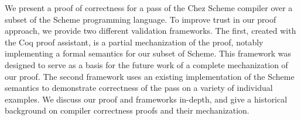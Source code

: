 We present a proof of correctness for a pass of the Chez Scheme compiler over a subset of the Scheme programming language. To improve trust in our proof approach, we provide two different validation frameworks. The first, created with the Coq proof assistant, is a partial mechanization of the proof, notably implementing a formal semantics for our subset of Scheme. This framework was designed to serve as a basis for the future work of a complete mechanization of our proof. The second framework uses an existing implementation of the Scheme semantics to demonstrate correctness of the pass on a variety of individual examples. We discuss our proof and frameworks in-depth, and give a historical background on compiler correctness proofs and their mechanization.